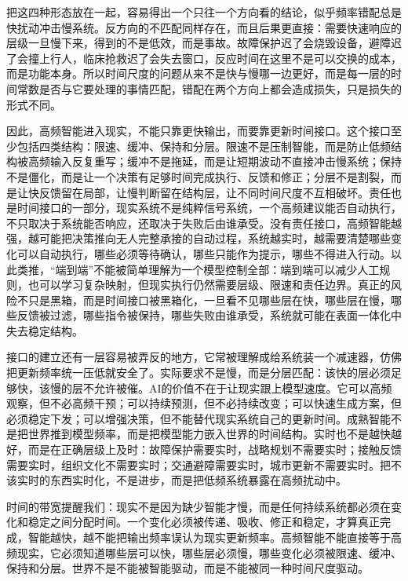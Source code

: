 把这四种形态放在一起，容易得出一个只往一个方向看的结论，似乎频率错配总是快扰动冲击慢系统。反方向的不匹配同样存在，而且后果更直接：需要快速响应的层级一旦慢下来，得到的不是低效，而是事故。故障保护迟了会烧毁设备，避障迟了会撞上行人，临床抢救迟了会失去窗口，反应时间在这里不是可以交换的成本，而是功能本身。所以时间尺度的问题从来不是快与慢哪一边更好，而是每一层的时间常数是否与它要处理的事情匹配，错配在两个方向上都会造成损失，只是损失的形式不同。


因此，高频智能进入现实，不能只靠更快输出，而要靠更新时间接口。这个接口至少包括四类结构：限速、缓冲、保持和分层。限速不是压制智能，而是防止低频结构被高频输入反复重写；缓冲不是拖延，而是让短期波动不直接冲击慢系统；保持不是僵化，而是让一个决策有足够时间完成执行、反馈和修正；分层不是割裂，而是让快反馈留在局部，让慢判断留在结构层，让不同时间尺度不互相破坏。责任也是时间接口的一部分，现实系统不是纯粹信号系统，一个高频建议能否自动执行，不只取决于系统能否响应，还取决于失败后由谁承受。没有责任接口，高频智能越强，越可能把决策推向无人完整承接的自动过程，系统越实时，越需要清楚哪些变化可以自动执行，哪些必须等待确认，哪些只能作为提示，哪些不得进入行动。以此类推，“端到端”不能被简单理解为一个模型控制全部：端到端可以减少人工规则，也可以学习复杂映射，但现实执行仍然需要层级、限速和责任边界。真正的风险不只是黑箱，而是时间接口被黑箱化，一旦看不见哪些层在快，哪些层在慢，哪些反馈被过滤，哪些指令被保持，哪些失败由谁承受，系统就可能在表面一体化中失去稳定结构。

接口的建立还有一层容易被弄反的地方，它常被理解成给系统装一个减速器，仿佛把更新频率统一压低就安全了。实际要求不是慢，而是分层匹配：该快的层必须足够快，该慢的层不允许被催。AI的价值不在于让现实跟上模型速度。它可以高频观察，但不必高频干预；可以持续预测，但不必持续改变；可以快速生成方案，但必须稳定下发；可以增强决策，但不能替代现实系统自己的更新时间。成熟智能不是把世界推到模型频率，而是把模型能力嵌入世界的时间结构。实时也不是越快越好，而是在正确层级上及时：故障保护需要实时，战略规划不需要实时；接触反馈需要实时，组织文化不需要实时；交通避障需要实时，城市更新不需要实时。把不该实时的东西实时化，不是进步，而是把低频系统暴露在高频扰动中。

时间的带宽提醒我们：现实不是因为缺少智能才慢，而是任何持续系统都必须在变化和稳定之间分配时间。一个变化必须被传递、吸收、修正和稳定，才算真正完成，智能越快，越不能把输出频率误认为现实更新频率。高频智能不能直接等于高频现实，它必须知道哪些层可以快，哪些层必须慢，哪些变化必须被限速、缓冲、保持和分层。世界不是不能被智能驱动，而是不能被同一种时间尺度驱动。


